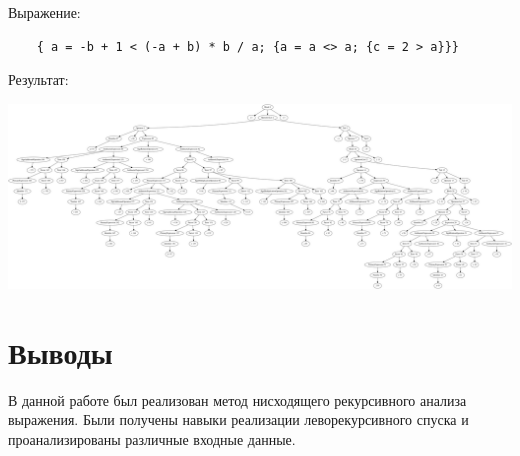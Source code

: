 \documentclass{bmstu-gost-7-32}
\begin{document}
Выражение:
\begin{verbatim}
	{ a = -b + 1 < (-a + b) * b / a; {a = a <> a; {c = 2 > a}}}
\end{verbatim}

Результат:

\noindent \includegraphics[width=\linewidth]{inc/img/tree}

\section*{Выводы}

В данной работе был реализован метод нисходящего рекурсивного анализа выражения.
Были получены навыки реализации леворекурсивного спуска и проанализированы различные входные данные.
\end{document}
